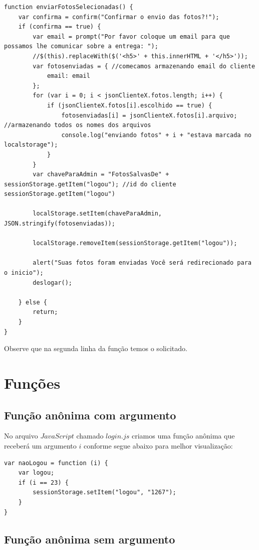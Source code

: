 \begin{lstlisting}
function enviarFotosSelecionadas() {
    var confirma = confirm("Confirmar o envio das fotos?!");
    if (confirma == true) {
        var email = prompt("Por favor coloque um email para que possamos lhe comunicar sobre a entrega: ");
        //$(this).replaceWith($('<h5>' + this.innerHTML + '</h5>'));
        var fotosenviadas = { //comecamos armazenando email do cliente
            email: email
        };
        for (var i = 0; i < jsonClienteX.fotos.length; i++) {
            if (jsonClienteX.fotos[i].escolhido == true) {
                fotosenviadas[i] = jsonClienteX.fotos[i].arquivo; //armazenando todos os nomes dos arquivos
                console.log("enviando fotos" + i + "estava marcada no localstorage");
            }
        }
        var chaveParaAdmin = "FotosSalvasDe" + sessionStorage.getItem("logou"); //id do cliente sessionStorage.getItem("logou")
       
        localStorage.setItem(chaveParaAdmin, JSON.stringify(fotosenviadas));

        localStorage.removeItem(sessionStorage.getItem("logou"));

        alert("Suas fotos foram enviadas Você será redirecionado para o inicio");
        deslogar();

    } else {
        return;
    }
}
\end{lstlisting}
	Observe que na segunda linha da função temos o solicitado.

\section{Funções}
\subsection{Função anônima com argumento}
	No arquivo $JavaScript$ chamado $login.js$ criamos uma função anônima que receberá um argumento $i$ conforme segue abaixo para melhor visualização:
	
\begin{lstlisting}
var naoLogou = function (i) {
    var logou;
    if (i == 23) {
        sessionStorage.setItem("logou", "1267");
    }
}
\end{lstlisting}

\subsection{Função anônima sem argumento}


